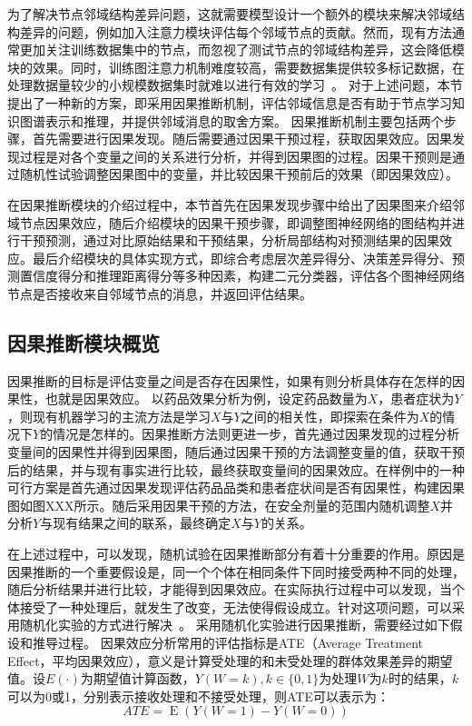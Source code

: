 \documentclass[algorithmlist, AutoFakeBold, AutoFakeSlant, figurelist, tablelist, nomlist, masters]{seuthesix}
\begin{document}
为了解决节点邻域结构差异问题，这就需要模型设计一个额外的模块来解决邻域结构差异的问题，例如加入注意力模块评估每个邻域节点的贡献。然而，现有方法通常更加关注训练数据集中的节点，而忽视了测试节点的邻域结构差异，这会降低模块的效果。同时，训练图注意力机制难度较高，需要数据集提供较多标记数据，在处理数据量较少的小规模数据集时就难以进行有效的学习~\cite{knyazev2019understanding}。
对于上述问题，本节提出了一种新的方案，即采用因果推断机制，评估邻域信息是否有助于节点学习知识图谱表示和推理，并提供邻域消息的取舍方案。
因果推断机制主要包括两个步骤，首先需要进行因果发现。随后需要通过因果干预过程，获取因果效应。因果发现过程是对各个变量之间的关系进行分析，并得到因果图的过程。因果干预则是通过随机性试验调整因果图中的变量，并比较因果干预前后的效果（即因果效应）。

在因果推断模块的介绍过程中，本节首先在因果发现步骤中给出了因果图来介绍邻域节点因果效应，随后介绍模块的因果干预步骤，即调整图神经网络的图结构并进行干预预测，通过对比原始结果和干预结果，分析局部结构对预测结果的因果效应。最后介绍模块的具体实现方式，即综合考虑层次差异得分、决策差异得分、预测置信度得分和推理距离得分等多种因素，构建二元分类器，评估各个图神经网络节点是否接收来自邻域节点的消息，并返回评估结果。

\subsection{因果推断模块概览}
因果推断的目标是评估变量之间是否存在因果性，如果有则分析具体存在怎样的因果性，也就是因果效应。
以药品效果分析为例，设定药品数量为$X$，患者症状为$Y$，则现有机器学习的主流方法是学习$X$与$Y$之间的相关性，即探索在条件为$X$的情况下$Y$的情况是怎样的。因果推断方法则更进一步，首先通过因果发现的过程分析变量间的因果性并得到因果图，随后通过因果干预的方法调整变量的值，获取干预后的结果，并与现有事实进行比较，最终获取变量间的因果效应。在样例中的一种可行方案是首先通过因果发现评估药品品类和患者症状间是否有因果性，构建因果图如图XXX所示。随后采用因果干预的方法，在安全剂量的范围内随机调整$X$并分析$Y$与现有结果之间的联系，最终确定$X$与$Y$的关系。

在上述过程中，可以发现，随机试验在因果推断部分有着十分重要的作用。原因是因果推断的一个重要假设是，同一个个体在相同条件下同时接受两种不同的处理，随后分析结果并进行比较，才能得到因果效应。在实际执行过程中可以发现，当个体接受了一种处理后，就发生了改变，无法使得假设成立。针对这项问题，可以采用随机化实验的方式进行解决~\cite{yao2021survey}。
采用随机化实验进行因果推断，需要经过如下假设和推导过程。
因果效应分析常用的评估指标是ATE（Average Treatment Effect，平均因果效应），意义是计算受处理的和未受处理的群体效果差异的期望值。设$E(\cdot)$为期望值计算函数，$Y(W=k), k \in \{0, 1\}$为处理$W$为$k$时的结果，$k$可以为0或1，分别表示接收处理和不接受处理，则ATE可以表示为：
\begin{equation}
  ATE=\operatorname{E}\left(Y(W=1) - Y(W=0)\right)
  \label{equation_ATE}
\end{equation}
\end{document}
